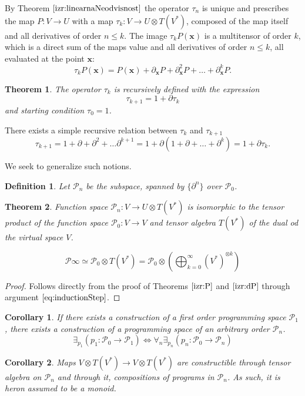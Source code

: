 \documentclass{article}
\newcommand{\x}{\mathbf{x}}
\newcommand{\dP}{\mathcal{P}}
\newcommand{\D}{\partial}
\newcommand{\sumd}{\tau}
\newtheorem{definicija}{Definition}[section]
\newtheorem{izrek}{Theorem}[section]
\newtheorem{corollary}{Corollary}[section]
\begin{document}
  By Theorem $\ref{izr:linearnaNeodvisnost}$ the operator $\sumd_n$ is unique and prescribes the map $P: V\to U$ with a map $\sumd_k:V\to
U\otimes T(V^*)$, composed of the map itself and all derivatives of order $n\le k$. The image $\sumd_kP(\x)$ is a multitensor of order $k$, which is a direct sum of the maps value and all derivatives of order $n\le k$, all evaluated at the point $\x$:
\begin{equation}
  \label{eq:multi_odvod}
  \sumd_kP(\x) = P(\x)+\D_\x P + \D^2_\x P + \ldots + \D^k_\x P.
\end{equation}
\begin{izrek}\label{izr:tauRek}
  The operator $\sumd_k$ is recursively defined with the expression
  \begin{equation}
    \label{eq:potenca(1+d)}
    \sumd_{k+1}=1+\D\sumd_{k}
  \end{equation}
and starting condition $\tau_0=1$.
\end{izrek}
There exists a simple recursive relation between $\sumd_k$ and $\sumd_{k+1}$
\begin{equation}
   \label{eq:rekurzija}
   \sumd_{k+1} = 1 + \D +\D^2+\ldots \D^{k+1} = 1+\D(1+\D+\ldots +\D^{k}) = 1+\D\sumd_k.
\end{equation} 

We seek to generalize such notions.

\begin{definicija}\label{def:P_n}
Let $\dP_n$ be the subspace, spanned by $\{\partial^n\}$ over $\dP_0$.
 \end{definicija}
 
 \begin{izrek}\label{izr:P_n}
 	Function space $\dP_n:V\to U\otimes T(V^*)$ is isomorphic to the tensor product of the function space $\dP_0:V\to V$ and tensor algebra $T(V^*)$ of the dual od the virtual space $V$.
 	
 	\begin{equation}
 	\label{eq:P_algebra}
 	 	    \dP\infty\simeq \dP_0\otimes T(V^*) = \dP_0 \otimes\left(\bigoplus_{k=0}^\infty (V^*)^{\otimes k} \right)
 	\end{equation}
 \end{izrek}
 
 \begin{proof} Follows directly from the proof of Theorems $\ref{izr:P}$ and $\ref{izr:dP}$ through argument $\eqref{eq:inductionStep}$.
  \end{proof}
  \begin{corollary}
  If there exists a construction of a first order programming space $\dP_1$, there exists a construction of a programming space of an arbitrary order $\dP_n$.
  \begin{equation}
  \exists_{p_1}(p_1:\dP_0\to\dP_1)\iff\forall_n\exists_{p_n}(p_n:\dP_0\to\dP_n)
  \end{equation}
  \end{corollary}
      \begin{corollary}\label{rem:vTen}
       Maps $V\otimes T(V^*)\to V\otimes T(V^*)$ are constructible through tensor algebra on $\dP_n$ and through it, compositions of programs in $\dP_n$. As such, it is heron assumed to be a monoid.
       \end{corollary}
       
\end{document}
